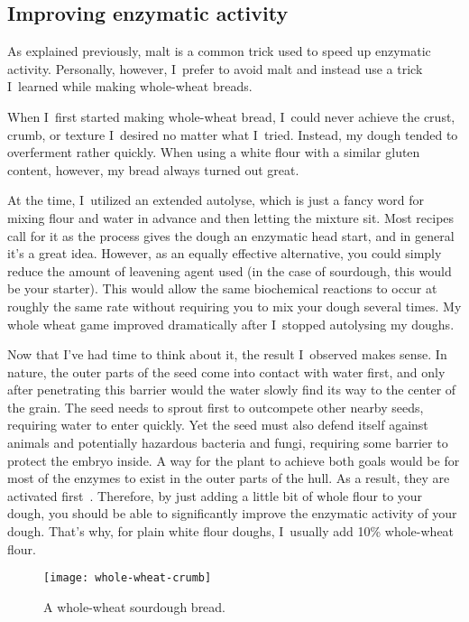 \subsection{Improving enzymatic activity}

As explained previously, malt is a common trick used to speed up enzymatic
activity. Personally, however, I~prefer to avoid malt and instead use a
trick I~learned while making whole-wheat breads.

When I~first started making whole-wheat bread, I~could never achieve the
crust, crumb, or texture I~desired no matter what I~tried. Instead, my dough
tended to overferment rather quickly. When using a white flour with a similar
gluten content, however, my bread always turned out great.

At the time, I~utilized an extended autolyse, which is just a fancy word for
mixing flour and water in advance and then letting the mixture sit. Most
recipes call for it as the process gives the dough an enzymatic head start, and
in general it's a great idea. However, as an equally effective alternative,
you could simply reduce the amount of leavening agent used (in the case of
sourdough, this would be your starter). This would allow the same biochemical
reactions to occur at roughly the same rate without requiring you to mix your
dough several times. My whole wheat game improved dramatically after I~stopped
autolysing my doughs.

Now that I've had time to think about it, the result I~observed makes sense.
In nature, the outer parts of the seed come into contact with water first, and
only after penetrating this barrier would the water slowly find its way to the
center of the grain. The seed needs to sprout first to outcompete other nearby
seeds, requiring water to enter quickly. Yet the seed must also defend itself
against animals and potentially hazardous bacteria and fungi, requiring some
barrier to protect the embryo inside. A way for the plant to achieve both goals
would be for most of the enzymes to exist in the outer parts of the hull. As a
result, they are activated first~\cite{enzymatic+activity+whole+wheat}. Therefore, by just adding a
little bit of whole flour to your dough, you should be able to significantly
improve the enzymatic activity of your dough. That's why, for plain white flour
doughs, I~usually add 10\% whole-wheat flour.

\begin{figure}
  \texttt{[image: whole-wheat-crumb]}
  \caption{A whole-wheat sourdough bread.}%
  \label{whole-wheat-crumb}
\end{figure}


